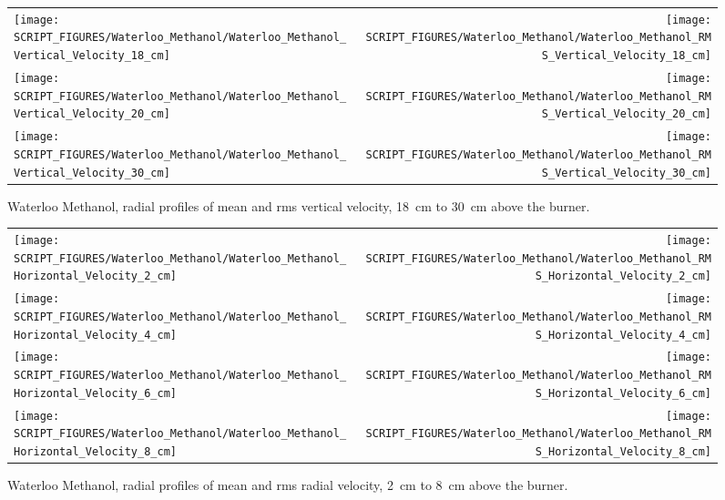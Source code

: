 \begin{figure}[p]
\begin{tabular*}{\textwidth}{l@{\extracolsep{\fill}}r}
\texttt{[image: SCRIPT\_FIGURES/Waterloo\_Methanol/Waterloo\_Methanol\_Vertical\_Velocity\_18\_cm]} &
\texttt{[image: SCRIPT\_FIGURES/Waterloo\_Methanol/Waterloo\_Methanol\_RMS\_Vertical\_Velocity\_18\_cm]} \\
\texttt{[image: SCRIPT\_FIGURES/Waterloo\_Methanol/Waterloo\_Methanol\_Vertical\_Velocity\_20\_cm]} &
\texttt{[image: SCRIPT\_FIGURES/Waterloo\_Methanol/Waterloo\_Methanol\_RMS\_Vertical\_Velocity\_20\_cm]} \\
\texttt{[image: SCRIPT\_FIGURES/Waterloo\_Methanol/Waterloo\_Methanol\_Vertical\_Velocity\_30\_cm]} &
\texttt{[image: SCRIPT\_FIGURES/Waterloo\_Methanol/Waterloo\_Methanol\_RMS\_Vertical\_Velocity\_30\_cm]}
\end{tabular*}
\caption[Waterloo Methanol, radial mean and rms vert.~vel., 18~cm to 30~cm above burner]
{Waterloo Methanol, radial profiles of mean and rms vertical velocity, 18~cm to 30~cm above the burner.}
\label{Water_Methanol_Vert_Vel_3}
\end{figure}


\begin{figure}[p]
\begin{tabular*}{\textwidth}{l@{\extracolsep{\fill}}r}
\texttt{[image: SCRIPT\_FIGURES/Waterloo\_Methanol/Waterloo\_Methanol\_Horizontal\_Velocity\_2\_cm]} &
\texttt{[image: SCRIPT\_FIGURES/Waterloo\_Methanol/Waterloo\_Methanol\_RMS\_Horizontal\_Velocity\_2\_cm]} \\
\texttt{[image: SCRIPT\_FIGURES/Waterloo\_Methanol/Waterloo\_Methanol\_Horizontal\_Velocity\_4\_cm]} &
\texttt{[image: SCRIPT\_FIGURES/Waterloo\_Methanol/Waterloo\_Methanol\_RMS\_Horizontal\_Velocity\_4\_cm]} \\
\texttt{[image: SCRIPT\_FIGURES/Waterloo\_Methanol/Waterloo\_Methanol\_Horizontal\_Velocity\_6\_cm]} &
\texttt{[image: SCRIPT\_FIGURES/Waterloo\_Methanol/Waterloo\_Methanol\_RMS\_Horizontal\_Velocity\_6\_cm]} \\
\texttt{[image: SCRIPT\_FIGURES/Waterloo\_Methanol/Waterloo\_Methanol\_Horizontal\_Velocity\_8\_cm]} &
\texttt{[image: SCRIPT\_FIGURES/Waterloo\_Methanol/Waterloo\_Methanol\_RMS\_Horizontal\_Velocity\_8\_cm]}
\end{tabular*}
\caption[Waterloo Methanol, radial mean and rms radial velocity, 2~cm to 8~cm above burner]
{Waterloo Methanol, radial profiles of mean and rms radial velocity, 2~cm to 8~cm above the burner.}
\label{Water_Methanol_Hori_Vel_1}
\end{figure}

